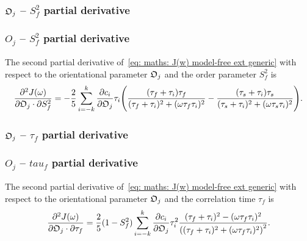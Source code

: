\begin{latexonly}
    \subsubsection{$\mathfrak{O}_j$ -- $S^2_f$ partial derivative}
\end{latexonly}
\begin{htmlonly}
    \subsubsection{$O_j$ -- $S^2_f$ partial derivative}
\end{htmlonly}

The second partial derivative of~\eqref{eq: maths: J(w) model-free ext generic} with respect to the orientational parameter $\mathfrak{O}_j$ and the order parameter $S^2_f$ is
\begin{equation}
    \frac{\partial^2 J(\omega)}{\partial \mathfrak{O}_j \cdot \partial S^2_f} = -\frac{2}{5} \sum_{i=-k}^k \frac{\partial c_i}{\partial \mathfrak{O}_j} \tau_i \Bigg(
        \frac{(\tau_f + \tau_i)\tau_f}{(\tau_f + \tau_i)^2 + (\omega \tau_f \tau_i)^2}
        - \frac{(\tau_s + \tau_i)\tau_s}{(\tau_s + \tau_i)^2 + (\omega \tau_s \tau_i)^2}
    \Bigg).
\end{equation}



\begin{latexonly}
    \subsubsection{$\mathfrak{O}_j$ -- $\tau_f$ partial derivative}
\end{latexonly}
\begin{htmlonly}
    \subsubsection{$O_j$ -- $tau_f$ partial derivative}
\end{htmlonly}

The second partial derivative of~\eqref{eq: maths: J(w) model-free ext generic} with respect to the orientational parameter $\mathfrak{O}_j$ and the correlation time $\tau_f$ is
\begin{equation}
    \frac{\partial^2 J(\omega)}{\partial \mathfrak{O}_j \cdot \partial \tau_f} = \frac{2}{5} (1 - S^2_f) \sum_{i=-k}^k
        \frac{\partial c_i}{\partial \mathfrak{O}_j} \tau_i^2
        \frac{(\tau_f + \tau_i)^2 - (\omega \tau_f \tau_i)^2}{\left((\tau_f + \tau_i)^2 + (\omega \tau_f \tau_i)^2 \right)^2}.
\end{equation}



